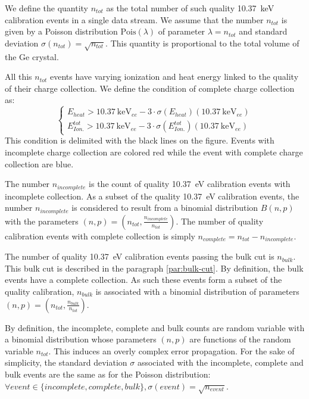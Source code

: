 We define the quantity $n_{tot}$ as the total number of such quality \SI{10.37}{\kilo\eV} calibration events in a single data stream. We assume that the number $n_{tot}$ is given by a Poisson distribution $\mathrm{Pois}(\lambda)$ of parameter $\lambda = n_{tot}$ and standard deviation $\sigma(n_{tot}) = \sqrt{n_{tot}}$. This quantity is proportional to the total volume of the Ge crystal.

All this $n_{tot}$ events have varying ionization and heat energy linked to the quality of their charge collection. We define the condition of complete charge collection as:
\begin{equation}
\begin{cases}
E_{heat} > \SI{10.37}{\kilo\eV_{ee}} - 3 \cdot \sigma(E_{heat})(\SI{10.37}{\kilo\eV_{ee}}) \\
E_{Ion.}^{tot} > \SI{10.37}{\kilo\eV_{ee}} - 3 \cdot \sigma(E_{Ion.}^{tot})(\SI{10.37}{\kilo\eV_{ee}})
\end{cases}
\end{equation}
This condition is delimited with the black lines on the figure. Events with incomplete charge collection are colored red while the event with complete charge collection are blue.

The number $n_{incomplete}$ is the count of quality \SI{10.37}{\eV} calibration events with incomplete collection. As a subset of the quality \SI{10.37}{\eV} calibration events, the number $n_{incomplete}$ is considered to result from a binomial distribution $B(n, p)$ with the parameters $(n,p) = (n_{tot}, \frac{n_{incomplete}}{n_{tot}})$. The number of quality calibration events with complete collection is simply $n_{complete} = n_{tot} - n_{incomplete}$.

The number of quality \SI{10.37}{\eV} calibration events passing the bulk cut is $n_{bulk}$. This bulk cut is described in the paragraph \ref{par:bulk-cut}. By definition, the bulk events have a complete collection. As such these events form a subset of the quality calibration, $n_{bulk}$ is associated with a binomial distribution of parameters $(n,p) = (n_{tot}, \frac{n_{bulk}}{n_{tot}})$.

By definition, the incomplete, complete and bulk counts are random variable with a binomial distribution whose parameters $(n,p)$ are functions of the random variable $n_{tot}$. This induces an overly complex error propagation. For the sake of simplicity, the standard deviation $\sigma$ associated with the incomplete, complete and bulk events are the same as for the Poisson distribution: $\forall event \in \{ incomplete, complete, bulk \}, \sigma (event) = \sqrt{n_{event}}$.

